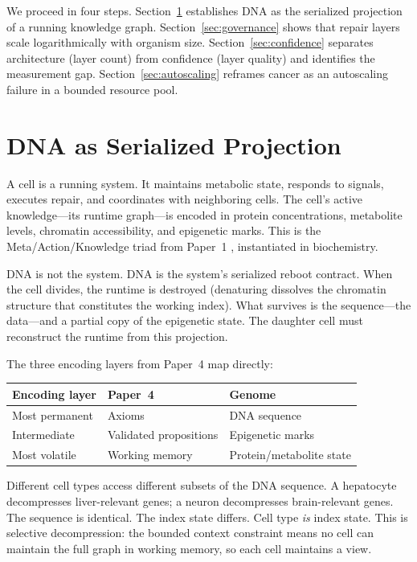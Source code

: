 \documentclass[11pt]{article}
\theoremstyle{definition}
\begin{document}
We proceed in four steps. Section~\ref{sec:projection} establishes
DNA as the serialized projection of a running knowledge graph.
Section~\ref{sec:governance} shows that repair layers scale
logarithmically with organism size. Section~\ref{sec:confidence}
separates architecture (layer count) from confidence (layer quality)
and identifies the measurement gap. Section~\ref{sec:autoscaling}
reframes cancer as an autoscaling failure in a bounded resource pool.

\section{DNA as Serialized Projection}
\label{sec:projection}

A cell is a running system. It maintains metabolic state, responds to
signals, executes repair, and coordinates with neighboring cells. The
cell's active knowledge---its runtime graph---is encoded in protein
concentrations, metabolite levels, chromatin accessibility, and
epigenetic marks. This is the Meta/Action/Knowledge triad from
Paper~1 \cite{McCarthy2026_BCA}, instantiated in biochemistry.

DNA is not the system. DNA is the system's serialized reboot contract.
When the cell divides, the runtime is destroyed (denaturing dissolves
the chromatin structure that constitutes the working index). What
survives is the sequence---the data---and a partial copy of the
epigenetic state. The daughter cell must reconstruct the runtime from
this projection.

The three encoding layers from Paper~4 \cite{McCarthy2026_BCA} map
directly:

\begin{center}
\begin{tabular}{lll}
\toprule
\textbf{Encoding layer} & \textbf{Paper~4} & \textbf{Genome} \\
\midrule
Most permanent & Axioms & DNA sequence \\
Intermediate & Validated propositions & Epigenetic marks \\
Most volatile & Working memory & Protein/metabolite state \\
\bottomrule
\end{tabular}
\end{center}

Different cell types access different subsets of the DNA sequence. A
hepatocyte decompresses liver-relevant genes; a neuron decompresses
brain-relevant genes. The sequence is identical. The index state
differs. Cell type \emph{is} index state. This is selective
decompression: the bounded context constraint means no cell can
maintain the full graph in working memory, so each cell maintains a
view.
\end{document}
